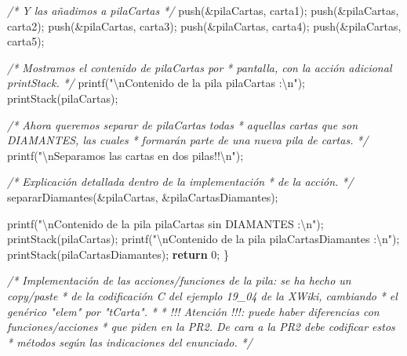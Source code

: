 \documentclass[
]{book}
\newenvironment{Shaded}{\begin{snugshade}}{\end{snugshade}}
\newcommand{\CommentTok}[1]{\textcolor[rgb]{0.56,0.35,0.01}{\textit{#1}}}
\newcommand{\ControlFlowTok}[1]{\textcolor[rgb]{0.13,0.29,0.53}{\textbf{#1}}}
\newcommand{\DecValTok}[1]{\textcolor[rgb]{0.00,0.00,0.81}{#1}}
\newcommand{\NormalTok}[1]{#1}
\newcommand{\SpecialCharTok}[1]{\textcolor[rgb]{0.00,0.00,0.00}{#1}}
\newcommand{\StringTok}[1]{\textcolor[rgb]{0.31,0.60,0.02}{#1}}
\begin{document}
\begin{Shaded}
\begin{Highlighting}[]
    \CommentTok{/* Y las añadimos a pilaCartas */}
\NormalTok{    push(\&pilaCartas, carta1);}
\NormalTok{    push(\&pilaCartas, carta2);}
\NormalTok{    push(\&pilaCartas, carta3);}
\NormalTok{    push(\&pilaCartas, carta4);}
\NormalTok{    push(\&pilaCartas, carta5);}
    
    \CommentTok{/* Mostramos el contenido de pilaCartas por}
\CommentTok{     * pantalla, con la acción adicional printStack.}
\CommentTok{     */}
\NormalTok{    printf(}\StringTok{"}\SpecialCharTok{\textbackslash{}n}\StringTok{Contenido de la pila \textquotesingle{}pilaCartas\textquotesingle{} :}\SpecialCharTok{\textbackslash{}n}\StringTok{"}\NormalTok{);}
\NormalTok{    printStack(pilaCartas);}
    
    \CommentTok{/* Ahora queremos separar de pilaCartas todas}
\CommentTok{     * aquellas cartas que son DIAMANTES, las cuales}
\CommentTok{     * formarán parte de una nueva pila de cartas.}
\CommentTok{     */}
\NormalTok{    printf(}\StringTok{"}\SpecialCharTok{\textbackslash{}n}\StringTok{Separamos las cartas en dos pilas!!}\SpecialCharTok{\textbackslash{}n}\StringTok{"}\NormalTok{);}
    
    \CommentTok{/* Explicación detallada dentro de la implementación}
\CommentTok{     * de la acción.}
\CommentTok{     */}
\NormalTok{    separarDiamantes(\&pilaCartas, \&pilaCartasDiamantes);}
    
\NormalTok{    printf(}\StringTok{"}\SpecialCharTok{\textbackslash{}n}\StringTok{Contenido de la pila \textquotesingle{}pilaCartas\textquotesingle{} sin DIAMANTES :}\SpecialCharTok{\textbackslash{}n}\StringTok{"}\NormalTok{);}
\NormalTok{    printStack(pilaCartas);}
\NormalTok{    printf(}\StringTok{"}\SpecialCharTok{\textbackslash{}n}\StringTok{Contenido de la pila \textquotesingle{}pilaCartasDiamantes\textquotesingle{} :}\SpecialCharTok{\textbackslash{}n}\StringTok{"}\NormalTok{);}
\NormalTok{    printStack(pilaCartasDiamantes);}
    \ControlFlowTok{return} \DecValTok{0}\NormalTok{;}
\NormalTok{\}}

\CommentTok{/* Implementación de las acciones/funciones de la pila: se ha hecho un copy/paste}
\CommentTok{ * de la codificación C del ejemplo 19\_04 de la XWiki, cambiando}
\CommentTok{ * el genérico "elem" por "tCarta".}
\CommentTok{ *}
\CommentTok{ * !!! Atención !!!: puede haber diferencias con funciones/acciones}
\CommentTok{ * que piden en la PR2. De cara a la PR2 debe codificar estos}
\CommentTok{ * métodos según las indicaciones del enunciado.}
\CommentTok{ */}


\end{Highlighting}
\end{Shaded}
\end{document}
